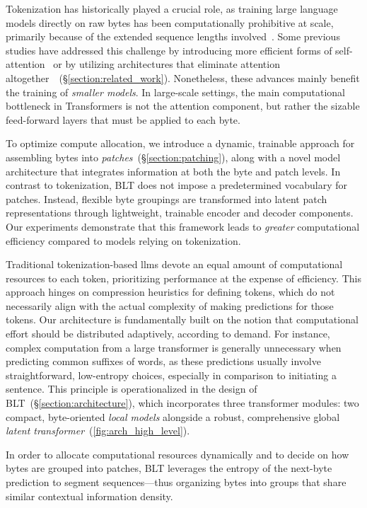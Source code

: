 Tokenization has historically played a crucial role, as training large language models directly on raw bytes has been computationally prohibitive at scale, primarily because of the extended sequence lengths involved~\citep{xue2022byt5}. Some previous studies have addressed this challenge by introducing more efficient forms of self-attention~\citep{el2020characterbert, clark2022canine} or by utilizing architectures that eliminate attention altogether~\citep{wang2024mambabyte}~(\S\ref{section:related_work}). Nonetheless, these advances mainly benefit the training of \textit{smaller models}. In large-scale settings, the main computational bottleneck in Transformers is not the attention component, but rather the sizable feed-forward layers that must be applied to each byte.

To optimize compute allocation, we introduce a dynamic, trainable approach for assembling bytes into \textit{patches}~(\S\ref{section:patching}), along with a novel model architecture that integrates information at both the byte and patch levels. In contrast to tokenization, {\textsc BLT} does not impose a predetermined vocabulary for patches. Instead, flexible byte groupings are transformed into latent patch representations through lightweight, trainable encoder and decoder components. Our experiments demonstrate that this framework leads to \textit{greater} computational efficiency compared to models relying on tokenization.

Traditional tokenization-based llms devote an equal amount of computational resources to each token, prioritizing performance at the expense of efficiency. This approach hinges on compression heuristics for defining tokens, which do not necessarily align with the actual complexity of making predictions for those tokens. Our architecture is fundamentally built on the notion that computational effort should be distributed adaptively, according to demand. For instance, complex computation from a large transformer is generally unnecessary when predicting common suffixes of words, as these predictions usually involve straightforward, low-entropy choices, especially in comparison to initiating a sentence. This principle is operationalized in the design of {\textsc BLT}~(\S\ref{section:architecture}), which incorporates three transformer modules: two compact, byte-oriented \textit{local models} alongside a robust, comprehensive global \textit{latent transformer}~(\autoref{fig:arch_high_level}). 

In order to allocate computational resources dynamically and to decide on how bytes are grouped into patches, {\textsc BLT} leverages the entropy of the next-byte prediction to segment sequences—thus organizing bytes into groups that share similar contextual information density.

